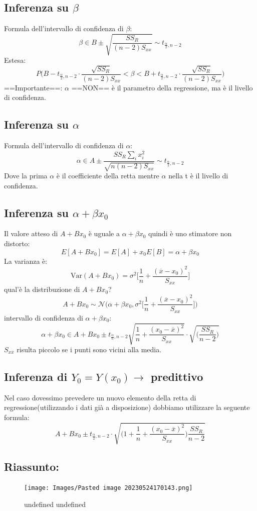 \documentclass[]{article}
\begin{document}
    \subsection{Inferenza su $\beta$}\label{sec:inferenza-su-beta}
    Formula dell'intervallo di confidenza di $\beta$:
    \[
     \beta \in B \pm \sqrt{\frac{SS_R}{(n-2)S_{xx}}} \sim t_{\frac{\alpha}{2}, n-2}
    \]
    Estesa:
    \[
     P\Big(B - t_{\frac{\alpha}{2},n-2} \cdot \frac{\sqrt{SS_R}}{(n-2)S_{xx}} < \beta < B + t_{\frac{\alpha}{2},n-2} \cdot \frac{\sqrt{SS_R}}{(n-2)S_{xx}}\Big) 
    \]
    ==Importante==: $\alpha$ ==NON== è il parametro della regressione, ma è il livello di confidenza.
    \subsection{Inferenza su $\alpha$}\label{sec:inferenza-su-alpha}
    Formula dell'intervallo di confidenza di $\alpha$:
    \[
     \alpha \in A \pm \frac{SS_R\sum_{i}{}x_i^2}{\sqrt{n(n-2)S_{xx}}} \sim t_{\frac{\alpha}{2},n-2}
    \]
    Dove la prima $\alpha$ è il coefficiente della retta mentre $\alpha$ nella t è il livello di confidenza.
    \subsection{Inferenza su $\alpha + \beta x_0$}\label{sec:inferenza-su-alpha--beta-x_0}
    Il valore atteso di $A + B x_0$ è uguale a $\alpha + \beta x_0$  quindi è uno stimatore non distorto:
    \[
     E[A +B x_0] = E[A] + x_0E[B] = \alpha + \beta x_0 
    \]
    La varianza è:
    \[
     \text{Var}(A+Bx_0) = \sigma^2 \Big[\frac{1}{n} + \frac{(\overline x - x_0)^2}{S_{xx}}  \Big] 
    \]
    qual'è la distribuzione di $A+Bx_0$?
    \[
     A+Bx_0 \sim \mathcal N \Big(\alpha+\beta x_0, \sigma^2 \Big[ \frac{1}{n} + \frac{(\overline x - x_0)^2}{S_{xx}} \Big]\Big) 
    \]
    intervallo di confidenza di $\alpha + \beta x_0$:
    \[
     \alpha + \beta x_0 \in A + B x_0 \pm t_{\frac{\alpha}{n}, n-2}\sqrt{\frac{1}{n} + \frac{(x_0- \overline x)^2}{S_{xx}}} \cdot \sqrt{\Big(\frac{SS_R}{n-2} \Big)}
    \]
    $S_{xx}$ risulta piccolo se i punti sono vicini alla media.
    \subsection{Inferenza di $Y_0 = Y(x_0) \rightarrow$ predittivo}\label{sec:inferenza-di-y_0--yx_0-rightarrow-predittivo}
    Nel caso dovessimo prevedere un nuovo elemento della retta di regressione(utilizzando i dati già a disposizione) dobbiamo utilizzare la seguente formula:
    \[
     A+Bx_0 \pm t_{\frac{\alpha}{2},n-2} \cdot \sqrt{\Big(1+\frac{1}{n} + \frac{(x_0-\overline x)^2}{S_{xx}}\Big)\frac{SS_R}{n-2}} 
    \]\subsection{Riassunto:}\label{sec:riassunto}
    \begin{figure}
    \texttt{[image: Images/Pasted image 20230524170143.png]}
    \caption{undefined undefined}\n\end{figure}
    
\end{document}
